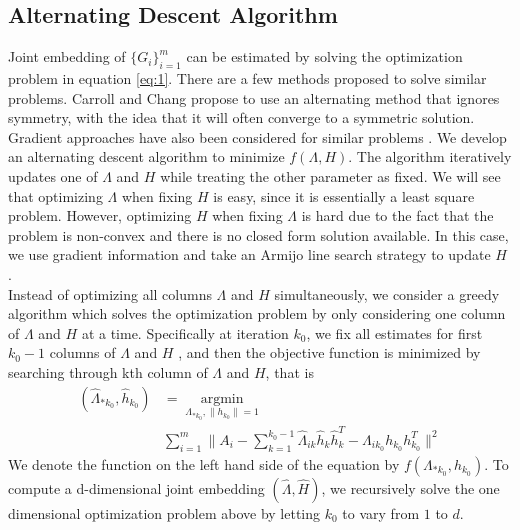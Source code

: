 \documentclass[10pt,journal,compsoc]{IEEEtran}
\begin{document}
\subsection{Alternating Descent Algorithm}
\noindent Joint embedding of $\{G_i \} _{i=1}^{m}$ can be estimated by solving the optimization problem in equation \eqref{eq:1}. There are a few methods proposed to solve similar problems. Carroll and Chang \cite{carroll1970analysis} propose to use an alternating method that ignores symmetry, with the idea that it will often converge to a symmetric solution. Gradient approaches have also been considered for similar problems \cite{tang2009clustering} \cite{kolda2015numerical}. We develop an alternating descent algorithm to minimize $f(\Lambda,H)$. The algorithm iteratively updates one of $\Lambda$ and $H$ while treating the other parameter as fixed. We will see that optimizing $\Lambda$ when fixing $H$ is easy, since it is essentially a least square problem. However, optimizing $H$ when fixing $\Lambda$ is hard due to the fact that the problem is non-convex and there is no closed form solution available. In this case, we use gradient information and take an Armijo line search strategy to update $H$ \cite{nocedal2006numerical}. \\

\noindent Instead of optimizing all columns $\Lambda$ and $H$ simultaneously, we consider a greedy algorithm which solves the optimization problem by only considering one column of  $\Lambda$ and $H$ at a time. Specifically at iteration $k_0$, we fix all estimates for first $k_0-1$ columns of $\Lambda$ and $H$ , and then the objective function is minimized by searching through kth column of $\Lambda$ and $H$, that is
\begin{align}(\hat{\Lambda}_{*k_0},\hat{h}_{k_0}) &= \underset{\Lambda_{*k_0},\|h_{k_0}\|=1}{\operatorname{argmin}} \nonumber\\ &\sum\limits_{i=1}^{m} \| A_i- \sum\limits_{k=1}^{k_0-1} \hat{\Lambda}_{ik} \hat{h}_{k} \hat{h}_{k}^T -\Lambda_{ik_0} h_{k_0} h_{k_0}^T\|  ^2
\end{align} 
We denote the function on the left hand side of the equation by $f(\Lambda_{*k_0},h_{k_0})$. To compute a d-dimensional joint embedding $(\hat{\Lambda},\hat{H})$, we recursively solve the one dimensional optimization problem above by letting $k_0$ to vary from $1$ to $d$. \\
\end{document}
